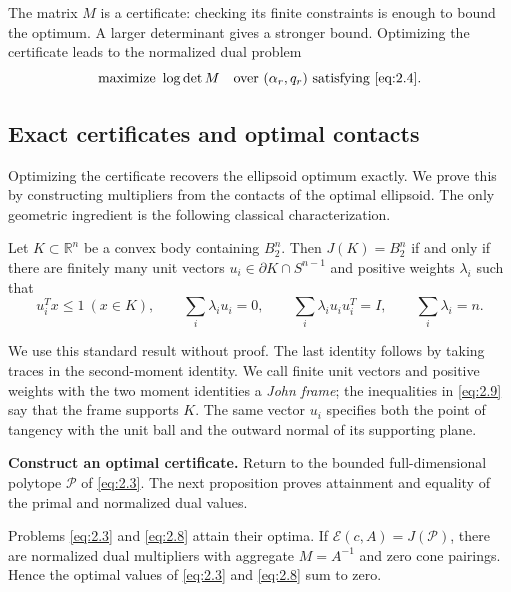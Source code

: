 The matrix $M$ is a certificate: checking its finite constraints is enough to bound the optimum. A larger determinant gives a stronger bound. Optimizing the certificate leads to the normalized dual problem
\begin{equation}\label{eq:2.8}
\text{maximize }\log\det M
\quad\text{over }(\alpha_r,q_r)\text{ satisfying \eqref{eq:2.4}}.
\end{equation}

\subsection{Exact certificates and optimal contacts}\label{sec:2.3}

Optimizing the certificate recovers the ellipsoid optimum exactly. We prove
this by constructing multipliers from the contacts of the optimal ellipsoid.
The only geometric ingredient is the following classical characterization.

\begin{lemma}\label{lem-john}
Let $K\subset\mathbb R^n$ be a convex body containing $B_2^n$.
Then $J(K)=B_2^n$ if and only if there are finitely many unit vectors
$u_i\in\partial K\cap S^{n-1}$ and positive weights $\lambda_i$ such that
\begin{equation}\label{eq:2.9}
u_i^Tx\le1\ (x\in K),\qquad
\sum_i\lambda_i u_i=0,\qquad
\sum_i\lambda_i u_i u_i^T=I,
\qquad \sum_i\lambda_i=n.
\end{equation}

\end{lemma}

We use this standard result without proof. The last identity follows by taking
traces in the second-moment identity. We call finite unit vectors and positive
weights with the two moment identities a \emph{John frame}; the inequalities in
\eqref{eq:2.9} say that the frame supports $K$. The same vector $u_i$ specifies both
the point of tangency with the unit ball and the outward normal of its
supporting plane.

\textbf{Construct an optimal certificate.} Return to the bounded full-dimensional
polytope $\mathcal P$ of \eqref{eq:2.3}. The next proposition proves attainment and
equality of the primal and normalized dual values.

\begin{proposition}\label{prop-exact-duality}
Problems \eqref{eq:2.3} and \eqref{eq:2.8} attain their optima. If $\mathcal E(c,A)=J(\mathcal P)$, there are normalized dual multipliers with aggregate $M=A^{-1}$ and zero cone pairings. Hence the optimal values of \eqref{eq:2.3} and \eqref{eq:2.8} sum to zero.

\end{proposition}

